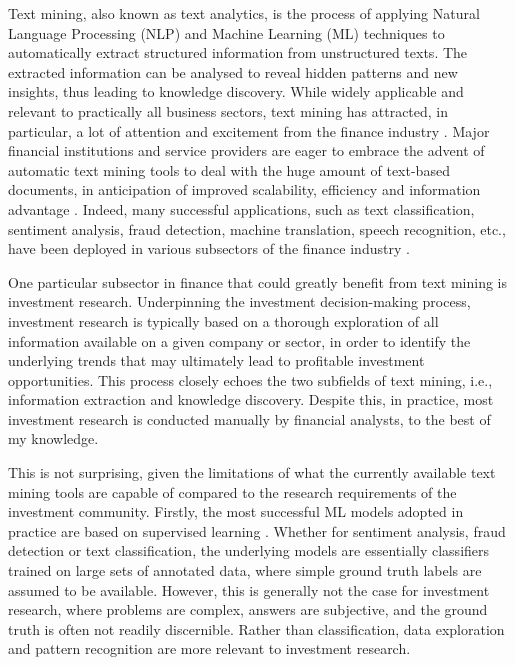 
Text mining, also known as text analytics, is the process of applying Natural Language Processing (NLP) and Machine Learning (ML) techniques to automatically extract structured information from unstructured texts. The extracted information can be analysed to reveal hidden patterns and new insights, thus leading to knowledge discovery. While widely applicable and relevant to practically all business sectors, text mining has attracted, in particular, a lot of attention and excitement from the finance industry \cite{MLinFinance2021, TextMiningFinancialSector2019}. Major financial institutions and service providers are eager to embrace the advent of automatic text mining tools to deal with the huge amount of text-based documents, in anticipation of improved scalability, efficiency and information advantage \cite{MLinUKFin2019, FadorFuture2018}. Indeed, many successful applications, such as text classification, sentiment analysis, fraud detection, machine translation, speech recognition, etc., have been deployed in various subsectors of the finance industry \cite{Tueregun2019, Gupta2020, Ravula2020}.

One particular subsector in finance that could greatly benefit from text mining is investment research. Underpinning the investment decision-making process, investment research is typically based on a thorough exploration of all information available on a given company or sector, in order to identify the underlying trends that may ultimately lead to profitable investment opportunities. This process closely echoes the two subfields of text mining, i.e., information extraction and knowledge discovery. Despite this, in practice, most investment research is conducted manually by financial analysts, to the best of my knowledge.

This is not surprising, given the limitations of what the currently available text mining tools are capable of compared to the research requirements of the investment community. Firstly, the most successful ML models adopted in practice are based on supervised learning \cite{TextMiningFinancialSector2019, FadorFuture2018, Tueregun2019, Gupta2020}. Whether for sentiment analysis, fraud detection or text classification, the underlying models are essentially classifiers trained on large sets of annotated data, where simple ground truth labels are assumed to be available. However, this is generally not the case for investment research, where problems are complex, answers are subjective, and the ground truth is often not readily discernible. Rather than classification, data exploration and pattern recognition are more relevant to investment research.  


